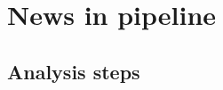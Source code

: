 \documentclass[9pt,aspectratio=43]{beamer}
\begin{document}




%





\section{News in pipeline}


\subsection{Analysis steps}
\end{document}
